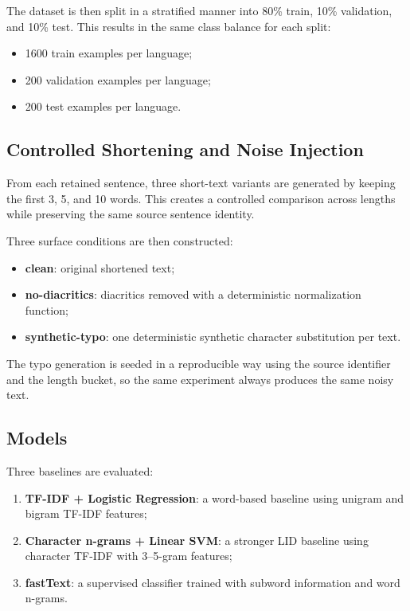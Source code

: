 \documentclass[conference]{IEEEtran}
\begin{document}
The dataset is then split in a stratified manner into 80\% train, 10\% validation, and 10\% test. This results in the same class balance for each split:

\begin{itemize}
    \item 1600 train examples per language;
    \item 200 validation examples per language;
    \item 200 test examples per language.
\end{itemize}

\subsection{Controlled Shortening and Noise Injection}

From each retained sentence, three short-text variants are generated by keeping the first 3, 5, and 10 words. This creates a controlled comparison across lengths while preserving the same source sentence identity.

Three surface conditions are then constructed:

\begin{itemize}
    \item \textbf{clean}: original shortened text;
    \item \textbf{no-diacritics}: diacritics removed with a deterministic normalization function;
    \item \textbf{synthetic-typo}: one deterministic synthetic character substitution per text.
\end{itemize}

The typo generation is seeded in a reproducible way using the source identifier and the length bucket, so the same experiment always produces the same noisy text.

\subsection{Models}

Three baselines are evaluated:

\begin{enumerate}
    \item \textbf{TF-IDF + Logistic Regression}: a word-based baseline using unigram and bigram TF-IDF features;
    \item \textbf{Character n-grams + Linear SVM}: a stronger LID baseline using character TF-IDF with 3--5-gram features;
    \item \textbf{fastText}: a supervised classifier trained with subword information and word n-grams.
\end{enumerate}
\end{document}
